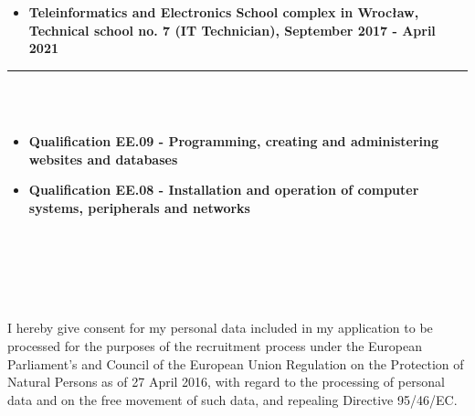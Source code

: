 \documentclass[10pt]{article}
\begin{document}
\begin{minipage}[t]{0.60\textwidth}
\begin{itemize}[leftmargin=*]
            \item \textbf{Teleinformatics and Electronics School complex in Wrocław, \\ Technical school no. 7 (IT Technician), September 2017 - April 2021} 
        \end{itemize}
        \rule{11cm}{1pt} \\ \\
        \fontsize{10pt}{10pt}
        \begin{itemize}[leftmargin=*]
            \setlength{\parskip}{0pt}
            \item \textbf{Qualification EE.09 - Programming, creating and administering \\ websites and databases}
            \item \textbf{Qualification EE.08 - Installation and operation of computer systems, peripherals and networks}
        \end{itemize}
        \rule{0pt}{0pt} \\ \\ \\ \\ \\
        \fontsize{7pt}{5pt}\selectfont  
        I hereby give consent for my personal data included in my application to be processed for 
        the purposes of the recruitment process under the European Parliament's and Council of the 
        European Union Regulation on the Protection of Natural Persons as of 27 April 2016, with 
        regard to the processing of personal data and on the free movement of such data, and repealing 
        Directive 95/46/EC.
    \end{minipage}
\end{document}
